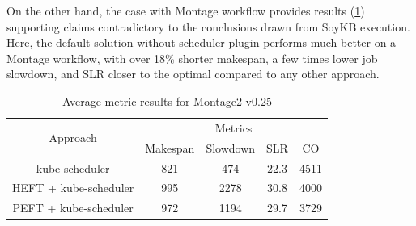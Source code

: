 On the other hand, the case with Montage workflow provides results (\cref{tab:metrics-sched-m025}) supporting claims contradictory to the conclusions drawn from SoyKB execution.
Here, the default solution without scheduler plugin performs much better on a Montage workflow, with over 18\% shorter makespan, a few times lower job slowdown, and SLR closer to the optimal compared to any other approach.





% 
%

\medskip
\begin{table}[H]
    \centering
    \begin{tabular}{|c|c|c|c|c|}
    \cline{1-5}
        \multirow{2}{*}{Approach} 
        &
        \multicolumn{4}{|c|}{Metrics} \\
    \cline{2-5}
        & Makespan & Slowdown & SLR & CO \\
    \cline{1-5}
        kube-scheduler & 821 & 474 & 22.3 & 4511 \\
    \cline{1-5}
        HEFT + kube-scheduler & 995 & 2278 & 30.8 & 4000 \\
    \cline{1-5}
        PEFT + kube-scheduler & 972 & 1194 & 29.7 & 3729 \\
    \cline{1-5}
    \end{tabular}
    \caption{Average metric results for Montage2-v0.25}
    \label{tab:metrics-sched-m025}
\end{table}


